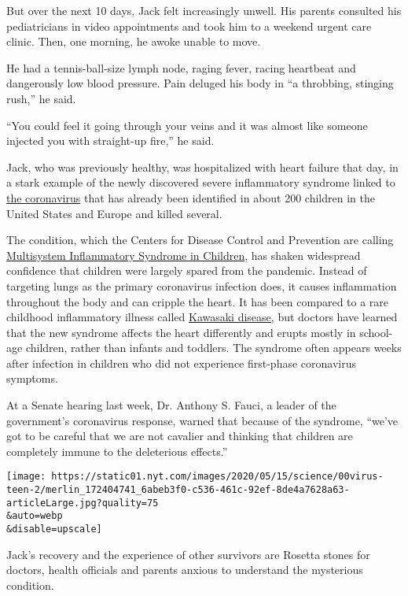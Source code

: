 But over the next 10 days, Jack felt increasingly unwell. His parents
consulted his pediatricians in video appointments and took him to a
weekend urgent care clinic. Then, one morning, he awoke unable to move.

He had a tennis-ball-size lymph node, raging fever, racing heartbeat and
dangerously low blood pressure. Pain deluged his body in ``a throbbing,
stinging rush,'' he said.

``You could feel it going through your veins and it was almost like
someone injected you with straight-up fire,'' he said.

Jack, who was previously healthy, was hospitalized with heart failure
that day, in a stark example of the newly discovered severe inflammatory
syndrome linked to
\href{https://www.nytimes.com/2020/05/21/podcasts/the-daily/coronavirus-children-sick.html?action=click\&module=Briefings\&pgtype=Homepage}{the
coronavirus} that has already been identified in about 200 children in
the United States and Europe and killed several.

The condition, which the Centers for Disease Control and Prevention are
calling
\href{https://emergency.cdc.gov/han/2020/han00432.asp}{Multisystem
Inflammatory Syndrome in Children}, has shaken widespread confidence
that children were largely spared from the pandemic. Instead of
targeting lungs as the primary coronavirus infection does, it causes
inflammation throughout the body and can cripple the heart. It has been
compared to a rare childhood inflammatory illness called
\href{https://www.cdc.gov/kawasaki/index.html}{Kawasaki disease}, but
doctors have learned that the new syndrome affects the heart differently
and erupts mostly in school-age children, rather than infants and
toddlers. The syndrome often appears weeks after infection in children
who did not experience first-phase coronavirus symptoms.

At a Senate hearing last week, Dr. Anthony S. Fauci, a leader of the
government's coronavirus response, warned that because of the syndrome,
``we've got to be careful that we are not cavalier and thinking that
children are completely immune to the deleterious effects.''

\texttt{[image: https://static01.nyt.com/images/2020/05/15/science/00virus-teen-2/merlin\_172404741\_6abeb3f0-c536-461c-92ef-8de4a7628a63-articleLarge.jpg?quality=75\\\&auto=webp\\\&disable=upscale]}

Jack's recovery and the experience of other survivors are Rosetta stones
for doctors, health officials and parents anxious to understand the
mysterious condition.

